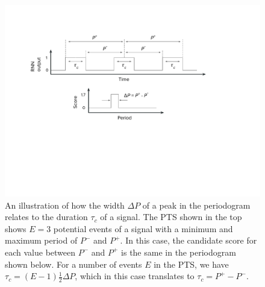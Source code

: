 \begin{figure}
    \centering
    \includegraphics[width=0.6\linewidth]{Methodology/Figures/fold_drawing.pdf}
    \caption{An illustration of how the width $\Delta P$ of a peak in the periodogram relates to the duration $\tau_c$ of a signal. The PTS shown in the top shows $E=3$ potential events of a signal with a minimum and maximum period of $P^-$ and $P^+$. In this case, the candidate score for each value between $P^-$ and $P^+$ is the same in the periodogram shown below. For a number of events $E$ in the PTS, we have $\tau_c = (E-1)\frac{1}{2}\Delta P$, which in this case translates to $\tau_c = P^+ - P^-$.}
    \label{fig:fold_drawing}
\end{figure}
